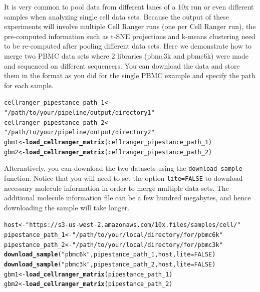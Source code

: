 \documentclass[10pt,oneside]{article}\usepackage[]{graphicx}\usepackage[]{color}
\makeatletter
\newcommand{\hlnum}[1]{\textcolor[rgb]{0.686,0.059,0.569}{#1}}%
\newcommand{\hlstr}[1]{\textcolor[rgb]{0.192,0.494,0.8}{#1}}%
\newcommand{\hlstd}[1]{\textcolor[rgb]{0.345,0.345,0.345}{#1}}%
\newcommand{\hlkwb}[1]{\textcolor[rgb]{0.69,0.353,0.396}{#1}}%
\newcommand{\hlkwc}[1]{\textcolor[rgb]{0.333,0.667,0.333}{#1}}%
\newcommand{\hlkwd}[1]{\textcolor[rgb]{0.737,0.353,0.396}{\textbf{#1}}}%
\newenvironment{kframe}{%
 \def\at@end@of@kframe{}%
 \ifinner\ifhmode%
  \def\at@end@of@kframe{\end{minipage}}%
  \begin{minipage}{\columnwidth}%
 \fi\fi%
 \def\FrameCommand##1{\hskip\@totalleftmargin \hskip-\fboxsep
 \colorbox{shadecolor}{##1}\hskip-\fboxsep
     \hskip-\linewidth \hskip-\@totalleftmargin \hskip\columnwidth}%
 \MakeFramed {\advance\hsize-\width
   \@totalleftmargin\z@ \linewidth\hsize
   \@setminipage}}%
 {\par\unskip\endMakeFramed%
 \at@end@of@kframe}
\newenvironment{knitrout}{}{} %
\makeatother
\begin{document}
It is very common to pool data from different lanes of a 10x run or even different samples when analyzing single cell data sets. Because the output of these experiments will involve multiple Cell Ranger runs (one per Cell Ranger run), the pre-computed information such as t-SNE projections and k-means clustering need to be re-computed after pooling different data sets.
Here we demonstrate how to merge two PBMC data sets where 2 libraries (pbmc3k and pbmc6k) were made and sequenced on different sequencers. You can download the data and store them in the format as you did for the single PBMC example and specify the path for each sample.
\begin{knitrout}
\color{fgcolor}\begin{kframe}
\begin{alltt}
\hlstd{cellranger_pipestance_path_1} \hlkwb{<-} \hlstr{"/path/to/your/pipeline/output/directory1"}
\hlstd{cellranger_pipestance_path_2} \hlkwb{<-} \hlstr{"/path/to/your/pipeline/output/directory2"}
\hlstd{gbm1} \hlkwb{<-} \hlkwd{load_cellranger_matrix}\hlstd{(cellranger_pipestance_path_1)}
\hlstd{gbm2} \hlkwb{<-} \hlkwd{load_cellranger_matrix}\hlstd{(cellranger_pipestance_path_2)}
\end{alltt}
\end{kframe}
\end{knitrout}
Alternatively, you can download the two datasets using the \verb!download_sample! function. Notice that you will need to set the option \verb!lite=FALSE! to download necessary molecule information in order to merge multiple data sets. The additional molecule information file can be a few hundred megabytes, and hence downloading the sample will take longer.
\begin{knitrout}
\color{fgcolor}\begin{kframe}
\begin{alltt}
\hlstd{host} \hlkwb{<-} \hlstr{"https://s3-us-west-2.amazonaws.com/10x.files/samples/cell/"}
\hlstd{pipestance_path_1} \hlkwb{<-} \hlstr{"/path/to/your/local/directory/for/pbmc6k"}
\hlstd{pipestance_path_2} \hlkwb{<-} \hlstr{"/path/to/your/local/directory/for/pbmc3k"}
\hlkwd{download_sample}\hlstd{(}\hlstr{"pbmc6k"}\hlstd{,pipestance_path_1,host,}\hlkwc{lite}\hlstd{=}\hlnum{FALSE}\hlstd{)}
\hlkwd{download_sample}\hlstd{(}\hlstr{"pbmc3k"}\hlstd{,pipestance_path_2,host,}\hlkwc{lite}\hlstd{=}\hlnum{FALSE}\hlstd{)}
\hlstd{gbm1} \hlkwb{<-} \hlkwd{load_cellranger_matrix}\hlstd{(pipestance_path_1)}
\hlstd{gbm2} \hlkwb{<-} \hlkwd{load_cellranger_matrix}\hlstd{(pipestance_path_2)}
\end{alltt}
\end{kframe}
\end{knitrout}
\end{document}
